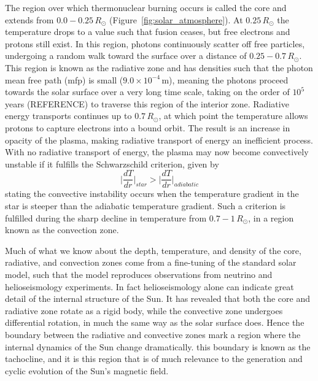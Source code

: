 The region over which thermonuclear burning occurs is called the core and extends from $0.0-0.25\,R_{\odot}$ (Figure~\ref{fig:solar_atmosphere}). At $0.25\,R_{\odot}$ the temperature drops to a value such that fusion ceases, but free electrons and protons still exist. In this region, photons continuously scatter off free particles, undergoing a random walk toward the surface over a distance of $0.25-0.7\,R_{\odot}$. This region is known as the radiative zone and has densities such that the photon mean free path (mfp) is small ($9.0\times10^{-4}$\,m), meaning the photons proceed towards the solar surface over a very long time scale, taking on the order of $10^{5}$ years (REFERENCE) to traverse this region of the interior zone. Radiative energy transports continues up to $0.7\,R_{\odot}$, at which point the temperature allows protons to capture electrons into a bound orbit. The result is an increase in opacity of the plasma, making radiative transport of energy an inefficient process. With no radiative transport of energy, the plasma may now become convectively unstable if it fulfills the Schwarzschild criterion, given by
\begin{equation}
\Bigg|\frac{dT}{dr}\Bigg|_{star} > \Bigg|\frac{dT}{dr}\Bigg|_{adiabatic}
\end{equation}
stating the convective instability occurs when the temperature gradient in the star is steeper than the adiabatic temperature gradient. Such a criterion is fulfilled during the sharp decline in temperature from $0.7-1\,R_{\odot}$, in a region known as the convection zone. 

Much of what we know about the depth, temperature, and density of the core, radiative, and convection zones come from a fine-tuning of the standard solar model, such that the model reproduces observations from neutrino and helioseismology experiments. In fact helioseismology alone can indicate great detail of the internal structure of the Sun. It has revealed that both the core and radiative zone rotate as a rigid body, while the convective zone undergoes differential rotation, in much the same way as the solar surface does. Hence the boundary between the radiative and convective zones mark a region where the internal dynamics of the Sun change dramatically. this boundary is known as the tachocline, and it is this region that is of much relevance to the generation and cyclic evolution of the Sun's magnetic field.


